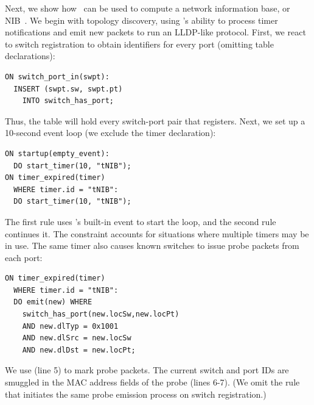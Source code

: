 Next, we show how \flowlog\ can be used to compute a network
information base, or NIB~\cite{koponen:osdi10-onix}. We begin with topology discovery, using \flowlog's
ability to process timer notifications and
emit new packets to run an LLDP-like protocol. First, we react to switch
registration to obtain identifiers for every port (omitting table declarations):
\begin{lstlisting}[label=list:6]
ON switch_port_in(swpt):
  INSERT (swpt.sw, swpt.pt) 
    INTO switch_has_port;
\end{lstlisting}
Thus, the  table will hold every
switch-port pair that registers. Next, we set up a
10-second event loop (we exclude the timer declaration):
\begin{lstlisting}[label=list:7]    
ON startup(empty_event):
  DO start_timer(10, "tNIB");
ON timer_expired(timer) 
  WHERE timer.id = "tNIB":
  DO start_timer(10, "tNIB");
\end{lstlisting}
The first rule uses \flowlog's built-in  event to start the
loop, and the second rule continues it. The constraint  accounts for situations where multiple timers may be in use.
The same timer also causes known switches to issue probe packets from each port:
\begin{lstlisting}[label=list:8]   
ON timer_expired(timer) 
  WHERE timer.id = "tNIB":
  DO emit(new) WHERE
    switch_has_port(new.locSw,new.locPt) 
    AND new.dlTyp = 0x1001
    AND new.dlSrc = new.locSw 
    AND new.dlDst = new.locPt;
\end{lstlisting}
We use  (line 5) to mark probe packets. The
current switch and port IDs are smuggled in the MAC address fields of the
probe (lines 6-7). (We omit the rule that initiates the same probe emission
process on switch registration.)

